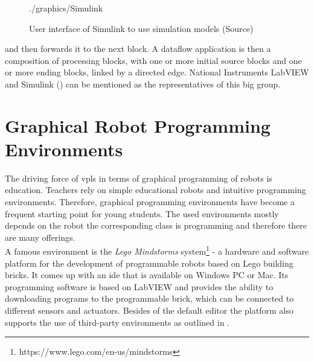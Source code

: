 \begin{figure}[!h]
	\centering
	\begin{overpic}[width=0.65\linewidth]{./graphics/Simulink}
	\end{overpic}
    \caption[User interface of Simulink to use simulation models]%
    {User interface of Simulink to use simulation models (Source\footnotemark)}
	\label{fig:Simulink}%
\end{figure}

and then forwards it to the next block. A dataflow application is then a composition of processing blocks, with one or more initial source blocks and one or more ending blocks, linked by a directed edge.\cite{Sousa2012DataflowPC} National Instruments LabVIEW \cite{LabView} and Simulink () can be mentioned as the representatives of this big group.

\section{Graphical Robot Programming Environments} \label{sec:GraphicalEnvs}
The driving force of \glspl{vpl} in terms of graphical programming of robots is education. Teachers rely on simple educational robots and intuitive programming environments. Therefore, graphical programming environments have become a frequent starting point for young students. The used environments mostly depends on the robot the corresponding class is programming and therefore there are many offerings. \\

A famous environment is the \textit{Lego Mindstorms} system\footnote{https://www.lego.com/en-us/mindstorms} - a hardware and software platform for the development of programmable robots based on Lego building bricks. It comes up with an \gls{ide} that is available on Windows PC or Mac. Its programming software is based on LabVIEW and provides the ability to downloading programs to the programmable brick, which can be connected to different sensors and actuators. Besides of the default editor the platform also supports the use of third-party environments as outlined in \cite{Hirst2003}. \\

